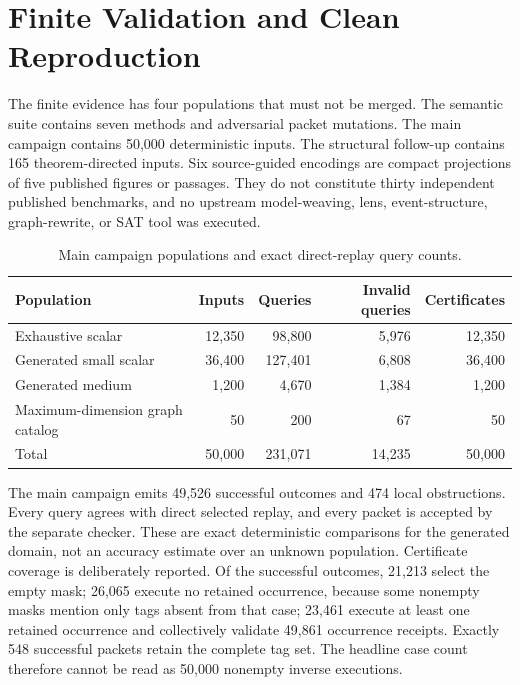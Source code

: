 \section{Finite Validation and Clean Reproduction}
\label{app:validation}

The finite evidence has four populations that must not be merged.  The semantic suite
contains seven methods and adversarial packet mutations.  The main campaign contains
50,000 deterministic inputs.  The structural follow-up contains 165 theorem-directed
inputs.  Six source-guided encodings are compact projections of five published
figures or passages.  They do not constitute thirty independent published benchmarks,
and no upstream model-weaving, lens, event-structure, graph-rewrite, or SAT tool was
executed.

\begin{table}[t]
\caption{Main campaign populations and exact direct-replay query counts.}
\label{tab:campaign-app}
\small
\begin{tabular}{@{}lrrrr@{}}
\toprule
Population & Inputs & Queries & Invalid queries & Certificates \\
\midrule
Exhaustive scalar & 12,350 & 98,800 & 5,976 & 12,350 \\
Generated small scalar & 36,400 & 127,401 & 6,808 & 36,400 \\
Generated medium & 1,200 & 4,670 & 1,384 & 1,200 \\
Maximum-dimension graph catalog & 50 & 200 & 67 & 50 \\
\midrule
Total & 50,000 & 231,071 & 14,235 & 50,000 \\
\bottomrule
\end{tabular}
\end{table}

The main campaign emits 49,526 successful outcomes and 474 local obstructions.  Every
query agrees with direct selected replay, and every packet is accepted by the separate
checker.  These are exact deterministic comparisons for the generated domain, not an
accuracy estimate over an unknown population.  Certificate coverage is deliberately
reported.  Of the successful outcomes, 21,213 select the empty mask; 26,065 execute no
retained occurrence, because some nonempty masks mention only tags absent from that
case; 23,461 execute at least one retained occurrence and collectively validate 49,861
occurrence receipts.  Exactly 548 successful packets retain the complete tag set.
The headline case count therefore cannot be read as 50,000 nonempty inverse executions.

